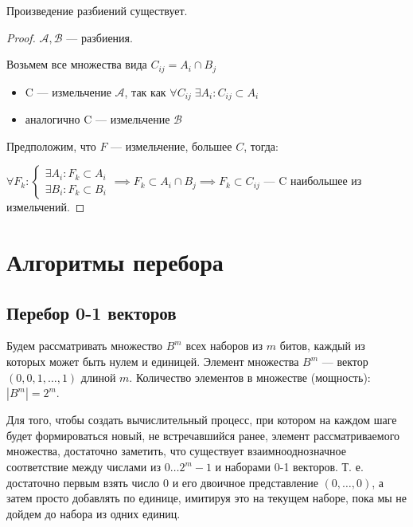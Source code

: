 


\begin{theorem}
    Произведение разбиений существует.
\end{theorem}

\begin{proof}
    $\mathcal{A}, \mathcal{B}$ --- разбиения.

    Возьмем все множества вида $C_{ij} = A_i \cap B_j$

    \begin{itemize}
        \item C --- измельчение $\mathcal{A}$, так как $\forall C_{ij} \; \exists A_i: C_{ij} \subset A_i$
        \item аналогично C --- измельчение $\mathcal{B}$
    \end{itemize}

    Предположим, что $F$ --- измельчение, большее $C$, тогда:

    $\forall F_k: \begin{cases}
        \exists A_i: F_k \subset A_i \\
        \exists B_i: F_k \subset B_i 
    \end{cases} \implies F_k \subset A_i \cap B_j \implies F_k \subset C_{ij}$ --- C наибольшее из измельчений.
\end{proof}

\chapter{Алгоритмы перебора}

\section{Перебор 0-1 векторов}

Будем рассматривать множество $B^m$ всех наборов из $m$ битов, каждый из которых может быть нулем и единицей. Элемент множества $B^m$ --- вектор $(0, 0, 1, \ldots, 1)$ длиной $m$. Количество элементов в множестве (мощность): $|B^m| = 2^m$.

Для того, чтобы создать вычислительный процесс, при котором на каждом шаге будет формироваться новый, не встречавшийся ранее, элемент рассматриваемого множества, достаточно заметить, что существует взаимнооднозначное соответствие между числами из $0…2^m - 1$ и наборами 0-1 векторов. Т. е. достаточно первым взять число 0 и его двоичное представление $(0,\ldots, 0)$, а затем просто добавлять по единице, имитируя это на текущем наборе, пока мы не дойдем до набора из одних единиц.

